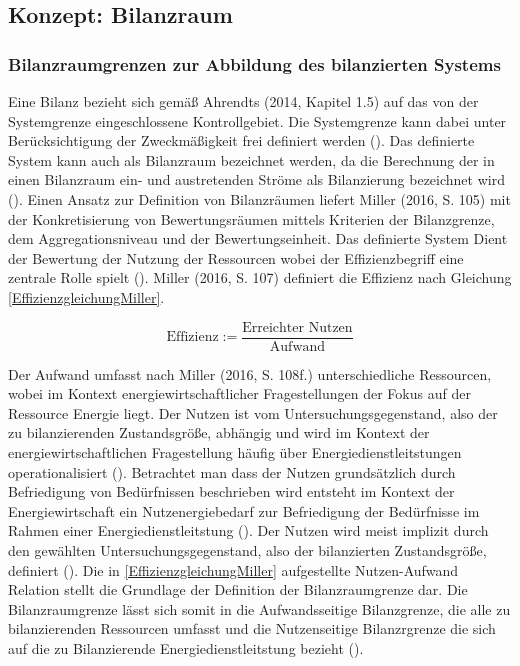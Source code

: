\subsection{Konzept: Bilanzraum}


\subsubsection{Bilanzraumgrenzen zur Abbildung des bilanzierten Systems}
Eine Bilanz bezieht sich gemäß Ahrendts (2014, Kapitel 1.5) auf das von der Systemgrenze eingeschlossene Kontrollgebiet. 
Die Systemgrenze kann dabei unter Berücksichtigung der Zweckmäßigkeit frei definiert werden (\cite[Kapitel 1.5]{Ahrendts.2014}).
Das definierte System kann auch als Bilanzraum bezeichnet werden, da die Berechnung der in einen Bilanzraum ein- und austretenden Ströme als Bilanzierung bezeichnet wird (\cite[S. 65]{Rönsch.2015}).
Einen Ansatz zur Definition von Bilanzräumen liefert Miller (2016, S. 105) mit der Konkretisierung von Bewertungsräumen mittels Kriterien der Bilanzgrenze, dem 
Aggregationsniveau und der Bewertungseinheit. Das definierte System Dient der Bewertung der Nutzung der Ressourcen wobei der Effizienzbegriff eine zentrale Rolle spielt (\cite[S. 107]{Miller.2016}).
Miller (2016, S. 107) definiert die Effizienz nach Gleichung \eqref{EffizienzgleichungMiller}.

\begin{equation}
    \text{Effizienz} := \frac{\text{Erreichter Nutzen}}{\text{Aufwand}}
    \label{EffizienzgleichungMiller}
\end{equation}

Der Aufwand umfasst nach Miller (2016, S. 108f.) unterschiedliche Ressourcen, wobei im Kontext energiewirtschaftlicher Fragestellungen der Fokus auf der Ressource Energie 
liegt. Der Nutzen ist vom Untersuchungsgegenstand, also der zu bilanzierenden Zustandsgröße, abhängig und wird im Kontext der energiewirtschaftlichen 
Fragestellung häufig über Energiedienstleitstungen operationalisiert (\cite[S. 107]{Miller.2016}). Betrachtet man dass der Nutzen grundsätzlich durch Befriedigung 
von Bedürfnissen beschrieben wird entsteht im Kontext der Energiewirtschaft ein Nutzenergiebedarf zur Befriedigung der Bedürfnisse im Rahmen einer Energiedienstleitstung 
(\cite[S. 107]{Miller.2016}). Der Nutzen wird meist implizit durch den gewählten Untersuchungsgegenstand, also der bilanzierten Zustandsgröße, definiert (\cite[S. 110]{Miller.2016}).
Die in \eqref{EffizienzgleichungMiller} aufgestellte Nutzen-Aufwand Relation stellt die Grundlage der Definition der Bilanzraumgrenze dar. 
Die Bilanzraumgrenze lässt sich somit in die Aufwandsseitige Bilanzgrenze, die alle zu bilanzierenden Ressourcen umfasst und die Nutzenseitige Bilanzrgrenze die sich auf 
die zu Bilanzierende Energiedienstleitstung bezieht (\cite[S. 111]{Miller.2016}).  

